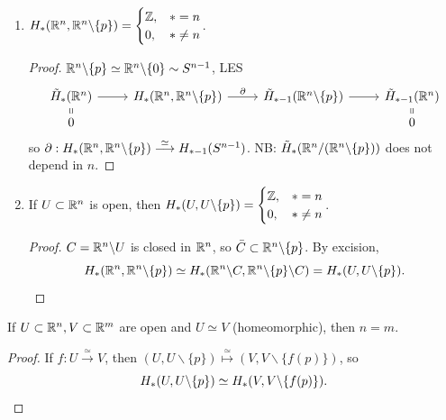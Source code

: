 \documentclass[a4paper,11pt]{article}
\begin{document}
				\begin{eg}
					\begin{enumerate}
						\item $\hg{\R^n,\R^n\backslash\{p\}}=\begin{cases}
							\Z,&\ast=n\\
							0,&\ast\neq n
						\end{cases}$.
						\begin{proof}
							$\R^n\backslash\{p\}\simeq\R^n\backslash\{0\}\sim S^{n-1}$, LES
							\begin{equation*}
								\begin{tikzcd}[row sep=tiny]
									\rhg{\R^n}\ar[d,equal]\ar[r]& \hg{\R^n,\R^n\backslash\{p\}}\ar[r,"\partial"]& \rhg[\ast-1]{\R^n\backslash\{p\}}\ar[r]& \rhg[\ast-1]{\R^n}\ar[d,equal]\\
									0 & & & 0
								\end{tikzcd}
							\end{equation*}
							so $\partial:\hg{\R^n,\R^n\backslash\{p\}}\overset{\simeq}{\longrightarrow }\hg[\ast-1]{S^{n-1}}$. NB: $\rhg{\R^n/(\R^n\backslash\{p\})}$ does not depend in $n$.
						\end{proof}
						\item If $U\subset\R^n$ is open, then $\hg{U,U\backslash\{p\}}=\begin{cases}
							\Z,&\ast=n\\0,&\ast\neq n
						\end{cases}$.
						\begin{proof}
							$C=\R^n\backslash U$ is closed in $\R^n$, so $\bar{C}\subset\R^n\backslash\{p\}$. By excision,
							\begin{equation*}
								\hg{\R^n,\R^n\backslash\{p\}}\simeq\hg{\R^n\backslash C,\R^n\backslash \{p\}\backslash C}=\hg{U,U\backslash\{p\}}.
							\end{equation*}
						\end{proof}
					\end{enumerate}
				\end{eg}

				\begin{cor}
					If $U\subset\R^n, V\subset\R^m$ are open and $U\simeq V$ (homeomorphic), then $n=m$.
				\end{cor}
				\begin{proof}
					If $f:U\overset{\simeq}{\longrightarrow}V$, then $(U,U\backslash\{p\})\overset{\simeq}{\mapsto}(V,V\backslash \{f(p)\})$, so
					\begin{equation*}
						\hg{U,U\backslash\{p\}}\simeq\hg{V,V\backslash\{f(p)\}}.
					\end{equation*}
				\end{proof}
\end{document}
